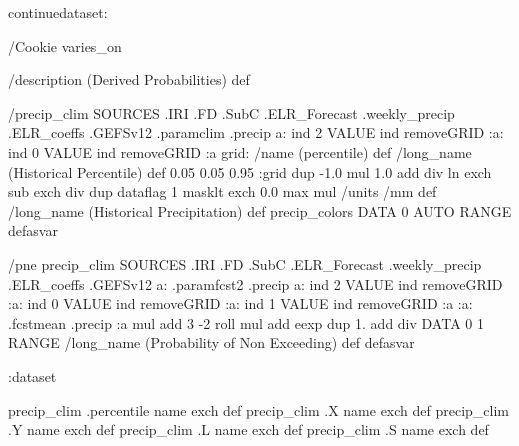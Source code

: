 \begin{ingrid}

continuedataset:


/Cookie varies_on

/description (Derived Probabilities) def

/precip_clim {
SOURCES .IRI .FD .SubC .ELR_Forecast .weekly_precip .ELR_coeffs .GEFSv12
  .paramclim .precip
   a:
     ind 2 VALUE
     ind removeGRID
     :a:
      ind 0 VALUE
      ind removeGRID
      :a
    grid:
      /name (percentile) def
      /long_name (Historical Percentile) def
      0.05 0.05 0.95 :grid
     dup
      -1.0 mul
      1.0 add
      div
     ln exch sub
    exch div
   dup dataflag
    1 masklt
    exch
    0.0 max
    mul
/units /mm def
/long_name (Historical Precipitation) def
precip_colors
DATA 0 AUTO RANGE
}defasvar

/pne{
precip_clim
SOURCES .IRI .FD .SubC .ELR_Forecast .weekly_precip .ELR_coeffs .GEFSv12
   a: .paramfcst2 .precip
    a:
      ind 2 VALUE
      ind removeGRID
      :a:
       ind 0 VALUE
       ind removeGRID
       :a:
        ind 1 VALUE
        ind removeGRID
        :a
      :a: .fcstmean .precip :a mul
      add
     3 -2 roll
     mul
    add
   eexp
   dup
    1. add
    div
   DATA 0 1 RANGE
  /long_name (Probability of Non Exceeding) def
}defasvar

:dataset

precip_clim .percentile name exch def
precip_clim .X name exch def
precip_clim .Y name exch def
precip_clim .L name exch def
precip_clim .S name exch def

\end{ingrid}

